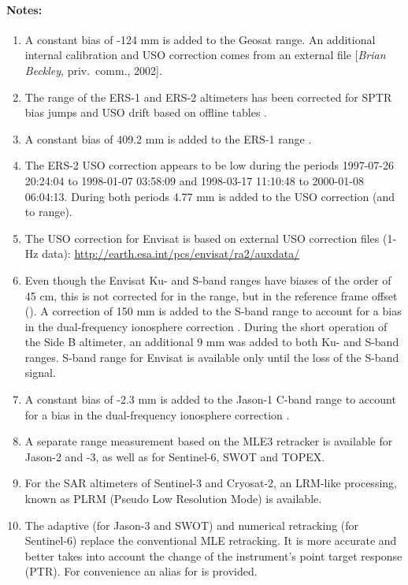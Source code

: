 \documentclass[a4paper,11pt,openany,natbib,nomargin]{thesis}
\newenvironment{notes}[1][Notes:]{\FloatBarrier\paragraph{#1}\begin{enumerate}}{\end{enumerate}}
\begin{document}
\begin{notes}
\item A constant bias of -124 mm is added to the Geosat range. An additional internal calibration and USO correction comes from an external file [\emph{Brian Beckley}, priv.\ comm., 2002].
\item The range of the ERS-1 and ERS-2 altimeters has been corrected for SPTR bias jumps and USO drift based on offline tables \citep{martini2000}.
\item A constant bias of 409.2 mm is added to the ERS-1 range \citep{francis1993b,stum1998a}.
\item The ERS-2 USO correction appears to be low during the periods 1997-07-26 20:24:04 to 1998-01-07 03:58:09 and 1998-03-17 11:10:48 to 2000-01-08 06:04:13. During both periods 4.77 mm is added to the USO correction (and to range).
\item The USO correction for Envisat is based on external USO correction files (1-Hz data): \url{http://earth.esa.int/pcs/envisat/ra2/auxdata/}
\item Even though the Envisat Ku- and S-band ranges have biases of the order of 45 cm, this is not corrected for in the range, but in the reference frame offset (). A correction of 150 mm is added to the S-band range to account for a bias in the dual-frequency ionosphere correction \citep{scharroo2010a}. During the short operation of the Side B altimeter, an additional 9 mm was added to both Ku- and S-band ranges.
S-band range for Envisat is available only until the loss of the S-band signal.\label{item:range_s}
\item A constant bias of -2.3 mm is added to the Jason-1 C-band range to account for a bias in the dual-frequency ionosphere correction \citep{scharroo2010a}.\label{item:range_c}
\item A separate range measurement based on the MLE3 retracker is available for Jason-2 and -3, as well as for Sentinel-6, SWOT and TOPEX.\label{item:range_ku_mle3}
\item For the SAR altimeters of Sentinel-3 and Cryosat-2, an LRM-like processing, known as PLRM (Pseudo Low Resolution Mode) is available.\label{item:range_ku_plrm}
\item The adaptive (for Jason-3 and SWOT) and numerical retracking (for Sentinel-6) replace the conventional MLE retracking. It is more accurate and better takes into account the change of the instrument's point target response (PTR). For convenience an alias  for  is provided.\label{item:range_ku_adaptive}\label{item:range_ku_nr} 
\end{notes}
\end{document}
